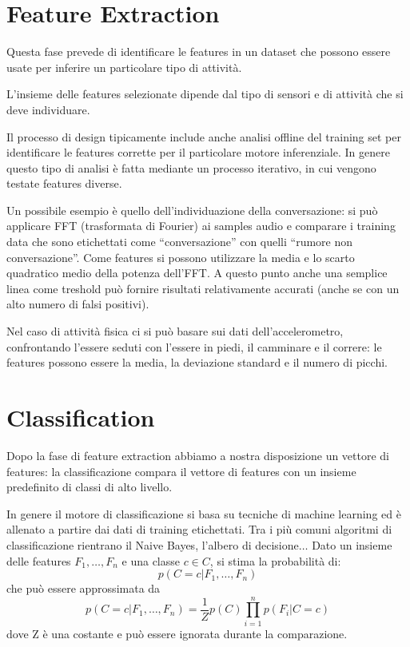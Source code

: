 \section{Feature Extraction}

Questa fase prevede di identificare le features in un dataset che possono essere
usate per inferire un particolare tipo di attività.

L'insieme delle features selezionate dipende dal tipo di sensori e di attività
che si deve individuare. 

Il processo di design tipicamente include anche analisi
offline del training set per identificare le features corrette per il
particolare motore inferenziale. 
In genere questo tipo di analisi è fatta mediante un processo iterativo, in cui vengono testate features diverse.

Un possibile esempio è quello dell'individuazione della conversazione: si può
applicare FFT (trasformata di Fourier) ai samples audio e comparare i training
data che sono etichettati come ``conversazione'' con quelli ``rumore non
conversazione''. 
Come features si possono utilizzare la media e lo scarto quadratico medio della potenza dell'FFT. 
A questo punto anche una semplice linea come treshold può fornire risultati relativamente accurati (anche se con un alto numero di falsi positivi).

Nel caso di attività fisica ci si può basare sui dati dell'accelerometro, confrontando l'essere seduti con l'essere in piedi, il camminare e il correre: le features possono essere la media, la deviazione standard e il numero di picchi.

\section{Classification}

Dopo la fase di feature extraction abbiamo a nostra disposizione un vettore di
features: la classificazione compara il vettore di features con un insieme
predefinito di classi di alto livello. 

In genere il motore di classificazione si basa su tecniche di machine learning ed è allenato a partire dai dati di training etichettati. 
Tra i più comuni algoritmi di classificazione rientrano il Naive Bayes, l'albero di decisione$\ldots$
\bigbreak
Dato un insieme delle features $F_1, \ldots, F_n$ e una classe $c \in C$, si stima la
probabilità di:
\begin{equation}
p(C=c|F_1, \ldots, F_n)
\end{equation}
che può essere approssimata da
\begin{equation}
p(C=c|F_1,\ldots,F_n)=\frac{1}{Z}p(C)\prod_{i=1}^{n}p(F_i|C=c)
\end{equation}
dove Z è una costante e può essere ignorata durante la comparazione. 

